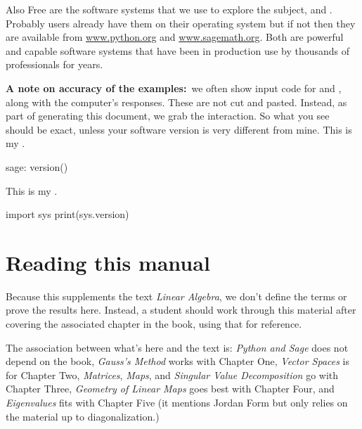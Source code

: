 
Also Free are the software systems that we use to explore the subject,
\python{} and \Sage{}.
Probably users already have them on their operating system but if not then 
they are available from  
\href{http://www.python.org}{\url{www.python.org}}
and 
\href{https://www.sagemath.org}{\url{www.sagemath.org}}.
Both are powerful and capable software systems that
have been in production use by thousands of professionals for years. 

\textbf{A note on accuracy of the examples:}~we often 
show input code for \python{} and \Sage{}, 
along with the computer's responses.
These are not cut and pasted.
Instead, as part of generating this 
document, we grab the interaction.
So what you see should be exact,
unless your software version is very different from mine.
This is my \Sage.
\begin{sagecommandline}
sage: version()  
\end{sagecommandline}
This is my \python{}. 
\begin{pythonconsole}
import sys
print(sys.version)
\end{pythonconsole}




\section{Reading this manual}
Because this supplements the text \textit{Linear Algebra}, 
we don't define the terms or prove the results here.
Instead, a student should work through this material after covering the associated
chapter in the book, using that for reference.

The association between what's here and the text is:
\textit{Python and Sage} does not depend on the
book,
\textit{Gauss’s Method} works with Chapter One,
\textit{Vector Spaces} is for Chapter Two,
\textit{Matrices}, 
\textit{Maps}, and 
\textit{Singular Value Decomposition} go with Chapter Three,
\textit{Geometry of Linear Maps} goes best with Chapter Four,
and \textit{Eigenvalues} fits with Chapter Five
(it mentions Jordan Form but only relies on the material up to 
diagonalization.)





